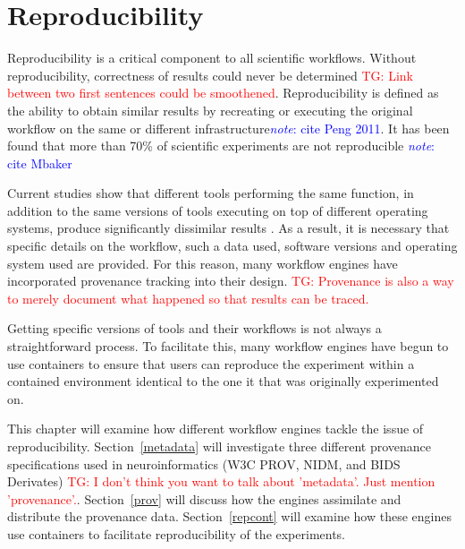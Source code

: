 \documentclass{report}
\newcommand{\note}[1]{\textcolor{blue}{\textit{note}: #1}}
\newcommand{\tristan}[1]{\textcolor{red}{TG: #1}}
\begin{document}
    \chapter{Reproducibility}\label{reproducibility}
        Reproducibility is a critical component to all scientific workflows. 
        Without reproducibility, correctness of results could never be 
        determined \tristan{Link between two first sentences could be smoothened}. Reproducibility is defined as the ability to obtain similar 
        results by 
        recreating or executing the original workflow on the same or different
        infrastructure\note{cite Peng 2011}. It has been found that more than 70\% of
        scientific experiments are not reproducible \note{cite Mbaker} 

        Current studies show that different tools 
        performing the same function, in addition to the same versions of tools 
        executing on top of different operating systems, produce significantly 
        dissimilar results \cite{bowring, gronenschild2011, glatard2015}. As a result, it is necessary that specific details 
        on the workflow, such a data used, software versions and operating 
        system used are provided. For this reason, many workflow engines have
        incorporated provenance tracking into their design. \tristan{Provenance is also
        a way to merely document what happened so that results can be traced.}

        Getting specific versions of tools and their workflows is not always 
        a straightforward process. To facilitate this, many workflow engines
        have begun to use containers to ensure that users can reproduce the 
        experiment within a contained environment identical to the one it that
        was originally experimented on. 

        This chapter will examine how different workflow engines tackle the 
        issue of reproducibility. Section~\ref{metadata} will investigate three 
        different provenance specifications used in neuroinformatics (W3C PROV, NIDM,
        and BIDS Derivates) \tristan{I don't think you want to talk about 'metadata'. Just
        mention 'provenance'.}. Section~\ref{prov} will discuss how the 
        engines assimilate and distribute the provenance data. 
        Section~\ref{repcont} will examine how these engines use containers to
        facilitate reproducibility of the experiments.
\end{document}
